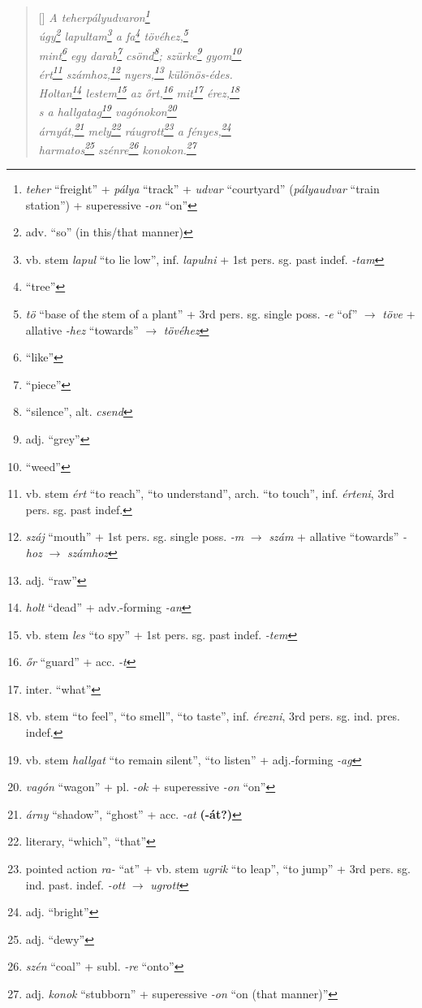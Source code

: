 \documentclass[a4paper,12pt,twoside,final]{book}
\begin{document}
\begin{verse}[\versewidth]
  \it
  A teherpályudvaron\footnote{\emph{teher} ``freight'' + \emph{pálya} ``track'' +
  \emph{udvar} ``courtyard'' (\emph{pályaudvar} ``train station'') +
  superessive \emph{-on} ``on''} \\
  úgy\footnote{adv. ``so'' (in this/that manner)}
  lapultam\footnote{vb. stem \emph{lapul} ``to lie low'',
  inf. \emph{lapulni} + 1st pers. sg. past indef. \emph{-tam}} a
  fa\footnote{``tree''} tövéhez,\footnote{\emph{tö} ``base of the stem
  of a plant'' + 3rd pers. sg. single poss. \emph{-e} ``of''
  $\rightarrow$ \emph{töve} + allative \emph{-hez} ``towards''
  $\rightarrow$ \emph{tövéhez}} \\
  mint\footnote{``like''} egy darab\footnote{``piece''}
  csönd\footnote{``silence'', alt. \emph{csend}};
  szürke\footnote{adj. ``grey''} gyom\footnote{``weed''} \\
  ért\footnote{vb. stem \emph{ért} ``to reach'', ``to understand'',
  arch. ``to touch'', inf. \emph{érteni}, 3rd pers. sg. past indef.}
  számhoz,\footnote{\emph{száj} ``mouth'' + 1st
  pers. sg. single poss. \emph{-m} $\rightarrow$ \emph{szám} +
  allative ``towards'' \emph{-hoz} $\rightarrow$ \emph{számhoz}}
  nyers,\footnote{adj. ``raw''} különös-édes. \\
  Holtan\footnote{\emph{holt} ``dead'' + adv.-forming \emph{-an}}
  lestem\footnote{vb. stem \emph{les} ``to spy'' + 1st
  pers. sg. past indef. \emph{-tem}} az őrt,\footnote{\emph{őr} ``guard'' +
  acc. \emph{-t}} mit\footnote{inter. ``what''}
  érez,\footnote{vb. stem ``to feel'', ``to smell'', ``to taste'',
  inf. \emph{érezni}, 3rd pers. sg. ind. pres. indef.} \\
  s a hallgatag\footnote{vb. stem \emph{hallgat} ``to remain silent'',
  ``to listen'' + adj.-forming \emph{-ag}}
  vagónokon\footnote{\emph{vagón} ``wagon'' + pl. \emph{-ok} +
  superessive \emph{-on} ``on''} \\
  árnyát,\footnote{\emph{árny} ``shadow'', ``ghost'' +
  acc. \emph{-at} \textbf{(-át?)}} mely\footnote{literary, ``which'',
  ``that''} ráugrott\footnote{pointed action \emph{ra-} ``at'' +
  vb. stem \emph{ugrik} ``to leap'', ``to jump'' + 3rd
  pers. sg. ind. past. indef. \emph{-ott} $\rightarrow$ \emph{ugrott}} a
  fényes,\footnote{adj. ``bright''} \\
  harmatos\footnote{adj. ``dewy''} szénre\footnote{\emph{szén}
  ``coal'' + subl. \emph{-re} ``onto''}
  konokon.\footnote{adj. \emph{konok} ``stubborn'' +
  superessive \emph{-on} ``on (that manner)''}
\end{verse}
\end{document}

